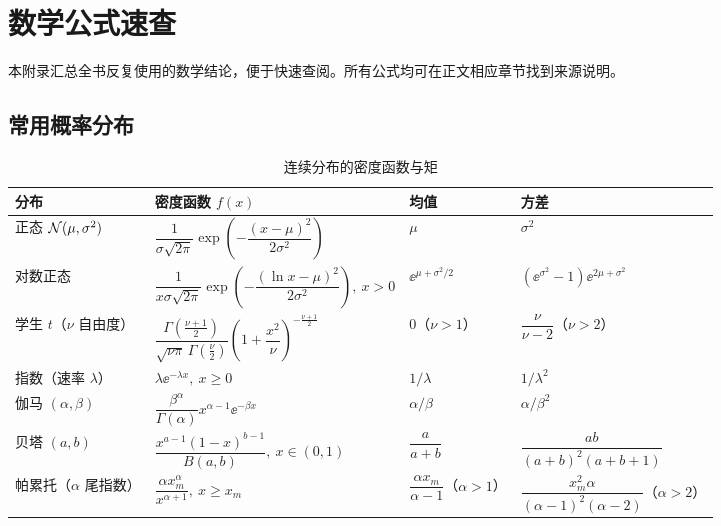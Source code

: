 \chapter{数学公式速查}
\label{app:math}

本附录汇总全书反复使用的数学结论，便于快速查阅。所有公式均可在正文相应章节找到来源说明。

\section{常用概率分布}

\begin{table}[htbp]
\centering
\caption{连续分布的密度函数与矩}\label{tab:dist-cont}
\scriptsize\setlength{\tabcolsep}{4pt}\renewcommand{\arraystretch}{1.2}
\begin{tabularx}{\textwidth}{@{}L{2.0cm}Y L{2.5cm}L{2.6cm}@{}}
\toprule
\textbf{分布} & \textbf{密度函数 $f(x)$} & \textbf{均值} & \textbf{方差} \\
\midrule
正态 $\mathcal{N}(\mu,\sigma^2)$ & $\dfrac{1}{\sigma\sqrt{2\pi}}\exp\left(-\dfrac{(x-\mu)^2}{2\sigma^2}\right)$ & $\mu$ & $\sigma^2$ \\
对数正态 & $\dfrac{1}{x\sigma\sqrt{2\pi}}\exp\left(-\dfrac{(\ln x-\mu)^2}{2\sigma^2}\right),\ x>0$ & $\ee^{\mu+\sigma^2/2}$ & $(\ee^{\sigma^2}-1)\ee^{2\mu+\sigma^2}$ \\
学生 $t$（$\nu$ 自由度） & $\dfrac{\Gamma\!\left(\frac{\nu+1}{2}\right)}{\sqrt{\nu\pi}\,\Gamma\!\left(\frac{\nu}{2}\right)}\left(1+\dfrac{x^2}{\nu}\right)^{-\frac{\nu+1}{2}}$ & $0$（$\nu>1$） & $\dfrac{\nu}{\nu-2}$（$\nu>2$） \\
指数（速率 $\lambda$） & $\lambda \ee^{-\lambda x},\ x\ge 0$ & $1/\lambda$ & $1/\lambda^2$ \\
伽马 $(\alpha,\beta)$ & $\dfrac{\beta^{\alpha}}{\Gamma(\alpha)}x^{\alpha-1}\ee^{-\beta x}$ & $\alpha/\beta$ & $\alpha/\beta^2$ \\
贝塔 $(a,b)$ & $\dfrac{x^{a-1}(1-x)^{b-1}}{B(a,b)},\ x\in(0,1)$ & $\dfrac{a}{a+b}$ & $\dfrac{ab}{(a+b)^2(a+b+1)}$ \\
帕累托（$\alpha$ 尾指数） & $\dfrac{\alpha x_m^{\alpha}}{x^{\alpha+1}},\ x\ge x_m$ & $\dfrac{\alpha x_m}{\alpha-1}$（$\alpha>1$） & $\dfrac{x_m^2\alpha}{(\alpha-1)^2(\alpha-2)}$（$\alpha>2$） \\
\bottomrule
\end{tabularx}
\end{table}

